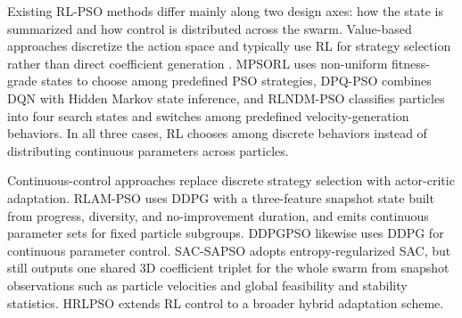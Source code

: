 \documentclass[final,5p,times]{elsarticle}
\begin{document}
Existing RL-PSO methods differ mainly along two design axes: how the state is summarized and how control is distributed across the swarm.
Value-based approaches discretize the action space and typically use RL for strategy selection rather than direct coefficient generation \cite{Watkins1992Qlearning}.
MPSORL \cite{Meng2023Multistrategy} uses non-uniform fitness-grade states to choose among predefined PSO strategies, DPQ-PSO \cite{Aoun2024Deep} combines DQN with Hidden Markov state inference, and RLNDM-PSO \cite{Li2023Reinforcement} classifies particles into four search states and switches among predefined velocity-generation behaviors.
In all three cases, RL chooses among discrete behaviors instead of distributing continuous parameters across particles.

Continuous-control approaches replace discrete strategy selection with actor-critic adaptation.
RLAM-PSO \cite{Yin2023RLAMPSO} uses DDPG with a three-feature snapshot state built from progress, diversity, and no-improvement duration, and emits continuous parameter sets for fixed particle subgroups.
DDPGPSO \cite{Zhang2024DDPGPSO} likewise uses DDPG for continuous parameter control.
SAC-SAPSO \cite{vonEschwege2024Soft} adopts entropy-regularized SAC, but still outputs one shared 3D coefficient triplet for the whole swarm from snapshot observations such as particle velocities and global feasibility and stability statistics.
HRLPSO \cite{Liu2023HRLPSO} extends RL control to a broader hybrid adaptation scheme.
\end{document}
